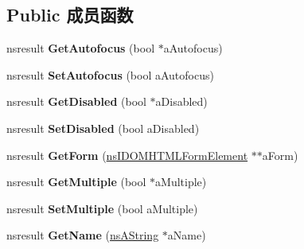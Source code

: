 \subsection*{Public 成员函数}
\begin{DoxyCompactItemize}
\item 
\mbox{\label{interfacens_i_d_o_m_h_t_m_l_select_element_ad15e1eda08ffbd2839ccb30c88ca6ba9}} 
nsresult {\bfseries Get\+Autofocus} (bool $\ast$a\+Autofocus)
\item 
\mbox{\label{interfacens_i_d_o_m_h_t_m_l_select_element_a2d9d6b59ba84cc2f6be10917ae14355b}} 
nsresult {\bfseries Set\+Autofocus} (bool a\+Autofocus)
\item 
\mbox{\label{interfacens_i_d_o_m_h_t_m_l_select_element_a00bc7e050a3b7d48d529ac87e2168b6d}} 
nsresult {\bfseries Get\+Disabled} (bool $\ast$a\+Disabled)
\item 
\mbox{\label{interfacens_i_d_o_m_h_t_m_l_select_element_a9c828773ef218b0e8dae4687720342aa}} 
nsresult {\bfseries Set\+Disabled} (bool a\+Disabled)
\item 
\mbox{\label{interfacens_i_d_o_m_h_t_m_l_select_element_a78aea1ede8b8f256eebddd6820493f10}} 
nsresult {\bfseries Get\+Form} (\hyperlink{interfacens_i_d_o_m_h_t_m_l_form_element}{ns\+I\+D\+O\+M\+H\+T\+M\+L\+Form\+Element} $\ast$$\ast$a\+Form)
\item 
\mbox{\label{interfacens_i_d_o_m_h_t_m_l_select_element_a99aa432216b1ed731ca9ce30a289aafa}} 
nsresult {\bfseries Get\+Multiple} (bool $\ast$a\+Multiple)
\item 
\mbox{\label{interfacens_i_d_o_m_h_t_m_l_select_element_a8a9f8809a6a12e498fe81992fdd6d146}} 
nsresult {\bfseries Set\+Multiple} (bool a\+Multiple)
\item 
\mbox{\label{interfacens_i_d_o_m_h_t_m_l_select_element_a1efc36bee6719f21e9e4f5fe390572eb}} 
nsresult {\bfseries Get\+Name} (\hyperlink{structns_string_container}{ns\+A\+String} $\ast$a\+Name)
$$
\end{DoxyCompactItemize}
